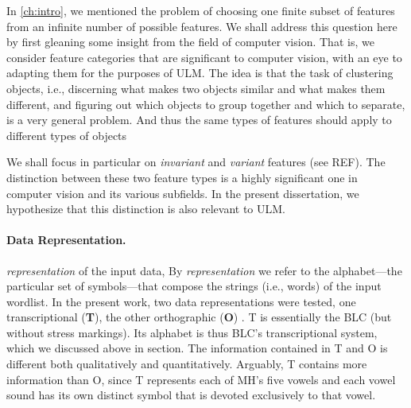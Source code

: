 In \ref{ch:intro}, we mentioned the problem of choosing one finite subset of features from an infinite number of possible features.
We shall address this question here by first gleaning some insight
from the field of computer vision. That is, we consider feature categories that 
are significant to computer vision, with an eye to adapting them for the purposes of ULM. The idea is that 
the task of clustering objects, i.e., discerning what makes two objects similar and what makes them different,
and figuring out which objects to group together and which to separate, is a very general problem. And thus the
same types of features should apply to different types of objects

We shall focus in particular on \emph{invariant} and \emph{variant} features (see REF). 
The distinction between these two feature types is a highly significant one in
computer vision and its various subfields. In the present dissertation, we hypothesize that this distinction is
also relevant to ULM. 


\paragraph{Data Representation.} 
 \emph{representation} of the input data,
By \emph{representation} we refer to the alphabet---the
particular set of symbols---that compose the strings (i.e., words) of the input wordlist.
In the present work, two data representations were tested, one transcriptional 
(\textbf{T}), the other orthographic (\textbf{O}) .
T is essentially the BLC (but without stress markings). Its alphabet is thus BLC's 
transcriptional system, which we discussed above in section. %
The information contained in T and O is different both qualitatively and quantitatively. 
Arguably, T contains more information than O,
since T represents each of MH's five vowels and each vowel sound has its own distinct symbol 
that is devoted exclusively to that vowel.

